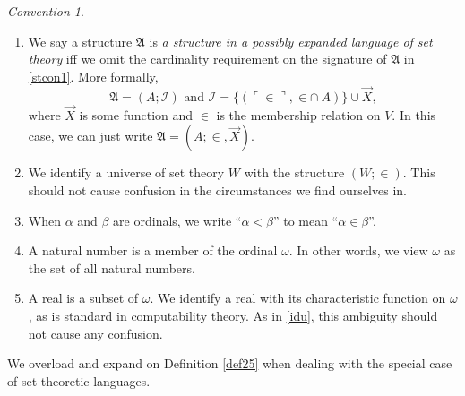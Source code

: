 \documentclass[12pt, twoside]{memoir}
\numberwithin{equation}{section}
\theoremstyle{definition}
\theoremstyle{remark}
\newtheorem{con}[thm]{Convention}
\theoremstyle{definition}
\theoremstyle{definition}
\theoremstyle{definition}
\theoremstyle{remark}
\begin{document}
\begin{con}
\begin{enumerate}[label=(\arabic*)]
    \item We say a structure $\mathfrak{A}$ is \emph{a structure in a possibly expanded language of set theory} iff we omit the cardinality requirement on the signature of $\mathfrak{A}$ in \ref{stcon1}. More formally, $$\mathfrak{A} = (A; \mathcal{I}) \text{ and } \mathcal{I} = \{(\ulcorner \in \urcorner, \in \cap \ A)\} \cup \Vec{X},$$ where $\Vec{X}$ is some function and $\in$ is the membership relation on $V$. In this case, we can just write $\mathfrak{A} = (A; \in, \Vec{X})$.
    \item\label{idu} We identify a universe of set theory $W$ with the structure $(W; \in)$. This should not cause confusion in the circumstances we find ourselves in.
    \item When $\alpha$ and $\beta$ are ordinals, we write ``$\alpha < \beta$'' to mean ``$\alpha \in \beta$''.
    \item A natural number is a member of the ordinal $\omega$. In other words, we view $\omega$ as the set of all natural numbers.
    \item A real is a subset of $\omega$. We identify a real with its characteristic function on $\omega$, as is standard in computability theory. As in \ref{idu}, this ambiguity should not cause any confusion.
\end{enumerate}
\end{con}

We overload and expand on Definition \ref{def25} when dealing with the special case of set-theoretic languages. 
\end{document}
